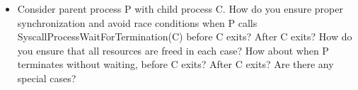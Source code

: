 \begin{enumerate}
\begin{itemize}
                
                \item Consider parent process P with child process C. How do you ensure proper synchronization and avoid race conditions when P calls SyscallProcessWaitForTermination(C) before C exits?  After C exits? How do you ensure that all resources are freed in each case? How about when P terminates without waiting, before C exits? After C exits? Are there any special cases?

            \end{itemize}

\end{enumerate}
